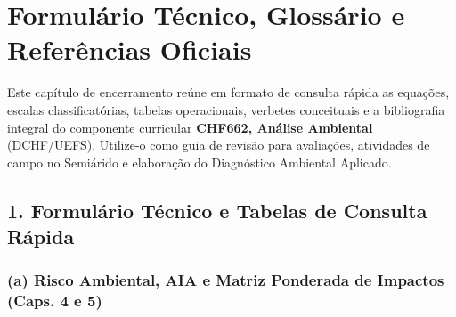 \clearpage
{}
{}
\chapter*{Formulário Técnico, Glossário e Referências Oficiais}

Este capítulo de encerramento reúne em formato de consulta rápida as equações, escalas classificatórias, tabelas operacionais, verbetes conceituais e a bibliografia integral do componente curricular \textbf{CHF662, Análise Ambiental} (DCHF/UEFS). Utilize-o como guia de revisão para avaliações, atividades de campo no Semiárido e elaboração do Diagnóstico Ambiental Aplicado.

\section*{1. Formulário Técnico e Tabelas de Consulta Rápida}

\subsection*{(a) Risco Ambiental, AIA e Matriz Ponderada de Impactos (Caps. 4 e 5)}

